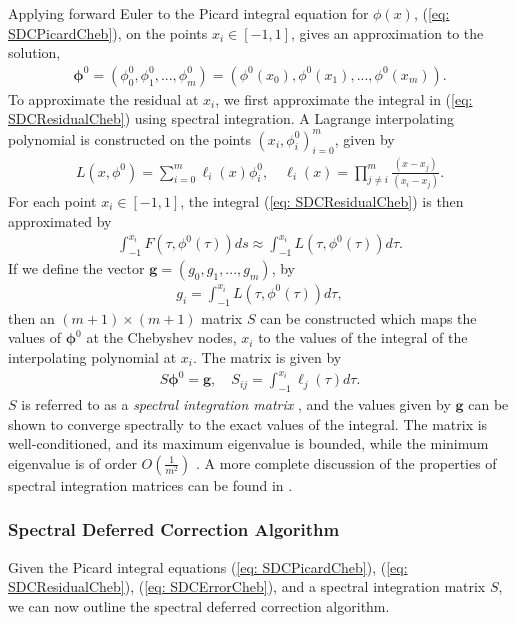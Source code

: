 \documentclass{sfuthesis}
\begin{document}
Applying forward Euler to the Picard integral equation for $\phi(x)$, (\ref{eq: SDCPicardCheb}), on the points $x_i \in [-1, 1]$, gives an approximation to the solution,
\begin{align*}
	\bm{\phi}^0=(\phi_0^0, \phi_1^0, ...,\phi_m^0)=(\phi^0(x_0), \phi^0(x_1), ..., \phi^0(x_m)).
\end{align*} 
To approximate the residual at $x_i$, we first approximate the integral in (\ref{eq: SDCResidualCheb}) using spectral integration. 
A Lagrange interpolating polynomial is constructed on the points $(x_i, \phi_i^0)_{i=0}^m$, given by
\begin{align*}
	L(x, \phi^0)=\sum_{i=0}^m \ell_i(x) \phi_i^0, \quad \ell_i(x)=\prod_{j\neq i}^m \frac{(x-x_j)}{(x_i-x_j)}.
\end{align*}
For each point $x_i \in [-1,1]$, the integral (\ref{eq: SDCResidualCheb}) is then approximated by
\begin{align*}
	 \int_{-1}^{x_i} F(\tau, \phi^0(\tau))ds \approx \int_{-1}^{x_i} L(\tau, \phi^0(\tau))d\tau.
\end{align*}
If we define the vector $\bm{g}=(g_0, g_1, ..., g_m)$, by
\begin{align*}
	g_i=\int_{-1}^{x_i}L(\tau, \phi^0(\tau)) d\tau,
\end{align*}
then an $(m+1)\times (m+1)$ matrix $S$ can be constructed which maps the values of $\bm{\phi}^0$ at the Chebyshev nodes, $x_i$ to the values of the integral of the interpolating polynomial at $x_i$. 
The matrix is given by 
\begin{align*}
	S \bm{\phi}^0=\mathbf{g}, \quad S_{ij}=\int_{-1}^{x_i} \ell_j(\tau) d\tau.
\end{align*}
$S$ is referred to as a {\textit{spectral integration matrix}} \cite{Dutt2000}, and the values given by $\mathbf{g}$ can be shown to converge spectrally to the exact values of the integral. The matrix is well-conditioned, and its maximum eigenvalue is bounded, while the minimum eigenvalue is of order $O(\frac{1}{m^2})$ \cite{Dutt2000}. A more complete discussion of the properties of spectral integration matrices can be found in \cite{Green91, Gott77, Hair93} . 
 

\subsubsection{Spectral Deferred Correction Algorithm}
Given the Picard integral equations (\ref{eq: SDCPicardCheb}), (\ref{eq: SDCResidualCheb}), (\ref{eq: SDCErrorCheb}), and a spectral integration matrix $S$, we can now outline the spectral deferred correction algorithm. 
\end{document}
